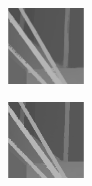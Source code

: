 \documentclass[preprint,10pt,5p,times,twocolumn]{elsarticle}
\begin{document}
\begin{figure}[t]
\begin{center}
\begin{subfigure}[b]{0.136\linewidth}
\end{subfigure}
\begin{subfigure}[b]{0.136\linewidth}
    \includegraphics[height = 2cm,width=\linewidth]{cmp_art_8X_LF_part.png}
    \label{fig:} %
\end{subfigure}
\begin{subfigure}[b]{0.136\linewidth}
    \includegraphics[height = 2cm,width=\linewidth]{cmp_art_8X_MST_part.png}
    \label{fig:} %
\end{subfigure}


\end{center}
\end{figure}
\end{document}
